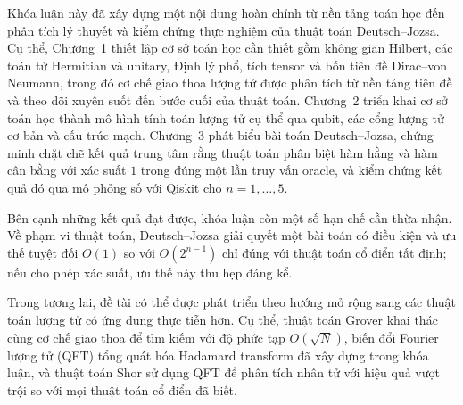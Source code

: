 Khóa luận này đã xây dựng một nội dung hoàn chỉnh từ nền tảng toán học
đến phân tích lý thuyết và kiểm chứng thực nghiệm của thuật toán
Deutsch--Jozsa. Cụ thể, Chương~1 thiết lập cơ sở toán học cần thiết gồm
không gian Hilbert, các toán tử Hermitian và unitary, Định lý phổ, tích
tensor và bốn tiên đề Dirac--von Neumann, trong đó cơ chế giao thoa lượng
tử được phân tích từ nền tảng tiên đề và theo dõi xuyên suốt đến bước cuối
của thuật toán. Chương~2 triển khai cơ sở toán học thành mô hình tính toán
lượng tử cụ thể qua qubit, các cổng lượng tử cơ bản và cấu trúc mạch.
Chương~3 phát biểu bài toán Deutsch--Jozsa, chứng minh chặt chẽ kết quả
trung tâm rằng thuật toán phân biệt hàm hằng và hàm cân bằng với xác suất
$1$ trong đúng một lần truy vấn oracle, và kiểm chứng kết quả đó qua mô
phỏng số với Qiskit cho $n = 1, \ldots, 5$.

Bên cạnh những kết quả đạt được, khóa luận còn một số hạn chế cần thừa
nhận. Về phạm vi thuật toán, Deutsch--Jozsa giải quyết một bài toán có điều
kiện và ưu thế tuyệt đối $O(1)$ so với $O(2^{n-1})$ chỉ đúng với thuật
toán cổ điển tất định; nếu cho phép xác suất, ưu thế này thu hẹp đáng kể.

Trong tương lai, đề tài có thể được phát triển theo hướng mở rộng sang các
thuật toán lượng tử có ứng dụng thực tiễn hơn. Cụ thể, thuật toán Grover
khai thác cùng cơ chế giao thoa để tìm kiếm với độ phức tạp $O(\sqrt{N})$,
biến đổi Fourier lượng tử (QFT) tổng quát hóa Hadamard transform đã xây
dựng trong khóa luận, và thuật toán Shor sử dụng QFT để phân tích nhân tử
với hiệu quả vượt trội so với mọi thuật toán cổ điển đã biết.